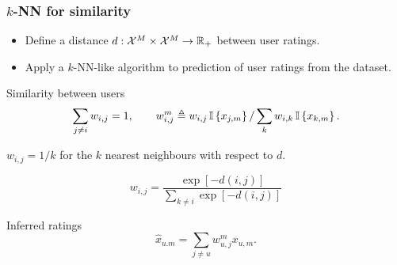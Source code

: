 \begin{frame}
  \frametitle{$k$-NN for similarity}
  \begin{exercise}
    \begin{itemize}
    \item Define a distance $d : {\mathcal{X}}^M \times {\mathcal{X}}^M \to {\mathbb{R}}_+$ between user ratings.
    \item Apply a $k$-NN-like algorithm to prediction of user ratings from the dataset.
    \end{itemize}
  \end{exercise}
\end{frame}
\begin{frame}
  \begin{block}{Similarity between users}
    \[
    \sum_{j \neq i} w_{i,j} = 1,
    \qquad
    w^m_{i,j} \mathrel{\triangleq} w_{i,j} \mathop{\mbox{\ensuremath{\mathbb{I}}}}\left\{x_{j,m}\right\} / \sum_k w_{i,k} \mathop{\mbox{\ensuremath{\mathbb{I}}}}\left\{x_{k,m}\right\}.
    \]
  \end{block}

  \begin{example}
    $w_{i,j} = 1/k$ for the $k$ nearest neighbours with respect to $d$.
  \end{example}


  \begin{example}
    \[
    w_{i,j} = \frac{\exp[-d(i,j)]}{\sum_{k \neq i} \exp[-d(i,j)]}
    \]
  \end{example}

  \begin{block}{Inferred ratings}
    \[
    \hat{x}_{u.m} = \sum_{j \neq u} w^m_{u,j} x_{u,m}.
    \]
  \end{block}
  
\end{frame}

